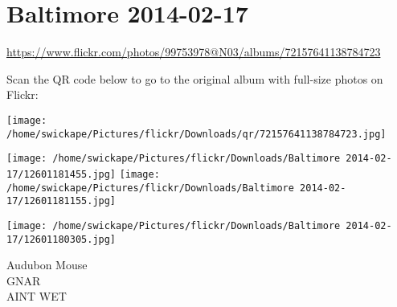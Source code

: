 \documentclass[10pt,letterpaper]{article}
\title{}
\author{}
\date{}
\begin{document}
\section*{Baltimore 2014-02-17}

\url{https://www.flickr.com/photos/99753978@N03/albums/72157641138784723}

Scan the QR code below to go to the original album with full-size photos on Flickr:

\texttt{[image: /home/swickape/Pictures/flickr/Downloads/qr/72157641138784723.jpg]}
\pagebreak

\texttt{[image: /home/swickape/Pictures/flickr/Downloads/Baltimore 2014-02-17/12601181455.jpg]}
\texttt{[image: /home/swickape/Pictures/flickr/Downloads/Baltimore 2014-02-17/12601181155.jpg]}

\texttt{[image: /home/swickape/Pictures/flickr/Downloads/Baltimore 2014-02-17/12601180305.jpg]}

Audubon Mouse\\
GNAR\\
AINT WET
\pagebreak
\end{document}
